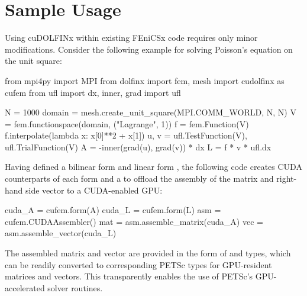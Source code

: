\section*{Sample Usage}

Using cuDOLFINx within existing FEniCSx code requires only minor modifications. Consider the following example for solving Poisson's equation on the unit square:
\begin{python}
from mpi4py import MPI
from dolfinx import fem, mesh
import cudolfinx as cufem
from ufl import dx, inner, grad
import ufl

N = 1000
domain = mesh.create_unit_square(MPI.COMM_WORLD, N, N)
V = fem.functionspace(domain, ("Lagrange", 1))
f = fem.Function(V)
f.interpolate(lambda x: x[0]**2 + x[1])
u, v = ufl.TestFunction(V), ufl.TrialFunction(V)
A = -inner(grad(u), grad(v)) * dx
L = f * v * ufl.dx
\end{python}
Having defined a bilinear form  and linear form , the following code creates CUDA counterparts of each form and a  to offload the assembly of the matrix and right-hand side vector to a CUDA-enabled GPU:
\begin{python}
cuda_A = cufem.form(A)
cuda_L = cufem.form(L)
asm = cufem.CUDAAssembler()
mat = asm.assemble_matrix(cuda_A)
vec = asm.assemble_vector(cuda_L)
\end{python}
The assembled matrix and vector are provided in the form of  and  types, which can be readily converted to corresponding PETSc types for GPU-resident matrices and vectors. This transparently enables the use of PETSc's GPU-accelerated solver routines.




